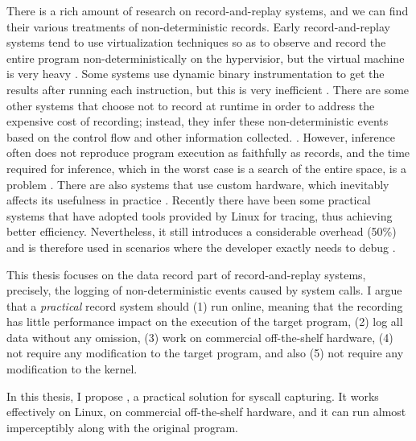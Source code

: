 There is a rich amount of research on record-and-replay systems, and we can find
their various treatments of non-deterministic records. Early record-and-replay
systems tend to use virtualization techniques so as to observe and record the
entire program non-deterministically on the hypervisior, but the virtual machine
is very heavy \cite{dunlap_revirt_2003, dunlap_smp-revirt_2008}. Some systems
use dynamic binary instrumentation to get the results after running each
instruction, but this is very inefficient \cite{bhansali_framework_2006}. There
are some other systems that choose not to record at runtime in order to address
the expensive cost of recording; instead, they infer these non-deterministic
events based on the control flow and other information collected.
\cite{altekar_odr_2009,cui_rept_2018}. However, inference often does not
reproduce program execution as faithfully as records, and the time required for
inference, which in the worst case is a search of the entire space, is a problem
\cite{replay_survey}. There are also systems that use custom hardware, which
inevitably affects its usefulness in practice \cite{montesinos_capo_2009}.
Recently there have been some practical systems that have adopted tools provided
by Linux for tracing, thus achieving better efficiency. Nevertheless, it still
introduces a considerable overhead (50\%) and is therefore used in scenarios
where the developer exactly needs to debug \cite{203227}.

This thesis focuses on the data record part of record-and-replay systems, precisely, the logging of non-deterministic events caused by system calls. I argue that a \textit{practical} record system should  (1) run online, meaning that the recording has little performance impact on the execution of the target program, (2) log all data without any omission, (3) work on commercial off-the-shelf  hardware, (4) not require any modification to the target program, and also (5) not require any modification to the kernel.

In this thesis, I propose \TheName, a practical solution for syscall capturing. It works effectively on Linux, on commercial off-the-shelf hardware, and it can run almost imperceptibly along with the original program. 




